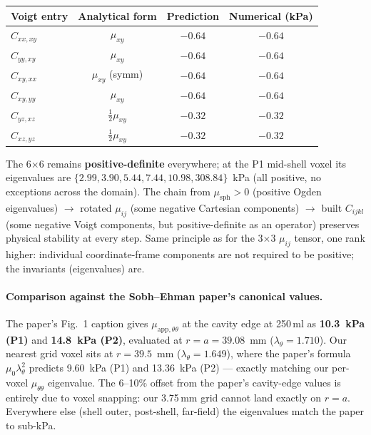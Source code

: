 \documentclass[11pt,letterpaper]{article}
\begin{document}
\begin{center}
\small
\begin{tabular}{lccc}
\toprule
Voigt entry & Analytical form & Prediction & Numerical (kPa) \\
\midrule
$C_{xx,xy}$ & $\mu_{xy}$              & $-0.64$ & $-0.64$ \\
$C_{yy,xy}$ & $\mu_{xy}$              & $-0.64$ & $-0.64$ \\
$C_{xy,xx}$ & $\mu_{xy}$ (symm)       & $-0.64$ & $-0.64$ \\
$C_{xy,yy}$ & $\mu_{xy}$              & $-0.64$ & $-0.64$ \\
$C_{yz,xz}$ & $\tfrac{1}{2}\mu_{xy}$  & $-0.32$ & $-0.32$ \\
$C_{xz,yz}$ & $\tfrac{1}{2}\mu_{xy}$  & $-0.32$ & $-0.32$ \\
\bottomrule
\end{tabular}
\end{center}

The 6$\times$6 remains \textbf{positive-definite} everywhere; at the
P1 mid-shell voxel its eigenvalues are $\{2.99, 3.90, 5.44, 7.44,
10.98, 308.84\}$~kPa (all positive, no exceptions across the
domain). The chain from $\mu_{\text{sph}} > 0$ (positive Ogden
eigenvalues) $\to$ rotated $\mu_{ij}$ (some negative Cartesian
components) $\to$ built $C_{ijkl}$ (some negative Voigt components,
but positive-definite as an operator) preserves physical stability
at every step. Same principle as for the 3$\times$3 $\mu_{ij}$
tensor, one rank higher: individual coordinate-frame components are
not required to be positive; the invariants (eigenvalues) are.

\paragraph{Comparison against the Sobh--Ehman paper's canonical values.}
The paper's Fig.~1 caption gives $\mu_{\text{app},\theta\theta}$ at the
cavity edge at 250\,\si{\milli\litre} as \textbf{10.3~kPa (P1)} and
\textbf{14.8~kPa (P2)}, evaluated at $r = a = 39.08$~mm
($\lambda_\theta = 1.710$). Our nearest grid voxel sits at
$r = 39.5$~mm ($\lambda_\theta = 1.649$), where the paper's formula
$\mu_0\lambda_\theta^2$ predicts 9.60~kPa (P1) and 13.36~kPa (P2) —
exactly matching our per-voxel $\mu_{\theta\theta}$ eigenvalue.
The 6--10\% offset from the paper's cavity-edge values is entirely
due to voxel snapping: our 3.75\,\si{\milli\metre} grid cannot land
exactly on $r = a$. Everywhere else (shell outer, post-shell,
far-field) the eigenvalues match the paper to sub-\si{\kilo\pascal}.
\end{document}
